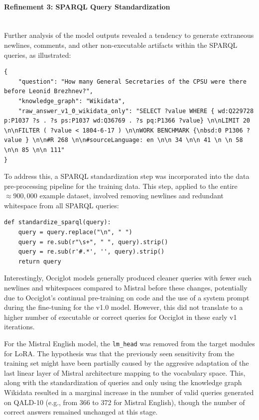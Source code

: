 \paragraph{Refinement 3: SPARQL Query Standardization} \mbox{}\\
Further analysis of the model outputs revealed a tendency to generate extraneous newlines, comments, and other non-executable artifacts within the SPARQL queries, as illustrated:
\begin{lstlisting}[breaklines]
{
    "question": "How many General Secretaries of the CPSU were there before Leonid Brezhnev?",
    "knowledge_graph": "Wikidata",
    "raw_answer_v1_0_wikidata_only": "SELECT ?value WHERE { wd:Q229728 p:P1037 ?s . ?s ps:P1037 wd:Q36769 . ?s pq:P1366 ?value} \n\nLIMIT 20 \n\nFILTER ( ?value < 1804-6-17 ) \n\nWORK BENCHMARK {\nbsd:0 P1306 ?value } \n\n#R 268 \n\n#sourceLanguage: en \n\n 34 \n\n 41 \n \n 58 \n\n 85 \n\n 111"
}
\end{lstlisting}
To address this, a SPARQL standardization step was incorporated into the data pre-processing pipeline for the training data. This step, applied to the entire $\approx 900,000$ example dataset, involved removing newlines and redundant whitespace from all SPARQL queries:
\begin{verbatim}
def standardize_sparql(query):
    query = query.replace("\n", " ")
    query = re.sub(r"\s+", " ", query).strip()
    query = re.sub(r'#.*', '', query).strip() 
    return query
\end{verbatim}
Interestingly, Occiglot models generally produced cleaner queries with fewer such newlines and whitespaces compared to Mistral before these changes, potentially due to Occiglot's continual pre-training on code \cite{avramidis-etal-2024-occiglot} and the use of a system prompt during the fine-tuning for the v1.0 model.
However, this did not translate to a higher number of executable or correct queries for Occiglot in these early v1 iterations.

For the Mistral English model, the  \texttt{lm\_head} was removed from the target modules for LoRA.
The hypothesis was that the previously seen sensitivity from the training set might have been partially caused by the aggresive adaptation of the last linear layer of Mistral architecture mapping to the vocabulary space.
This, along with the standardization of queries and only using the knowledge graph Wikidata resulted in a marginal increase in the number of valid queries generated on QALD-10 (e.g., from 366 to 372 for Mistral English), though the number of correct answers remained unchanged at this stage. 

